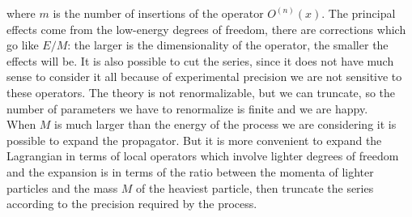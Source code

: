 \documentclass[../main.tex]{subfiles}
\begin{document}
where $m$ is the number of insertions of the operator $O^{(n)}(x)$. The principal effects come from the low-energy degrees of freedom, there are corrections which go like $E/M$: the larger is the dimensionality of the operator, the smaller the effects will be. It is also possible to cut the series, since it does not have much sense to consider it all because of experimental precision we are not sensitive to these operators. The theory is not renormalizable, but we can truncate, so the number of parameters we have to renormalize is finite and we are happy. \\
When $M$ is much larger than the energy of the process we are considering it is possible to expand the propagator. But it is more convenient to expand the Lagrangian in terms of local operators which involve lighter degrees of freedom and the expansion is in terms of the ratio between the momenta of lighter particles and the mass $M$ of the heaviest particle, then truncate the series according to the precision required by the process.
\end{document}
